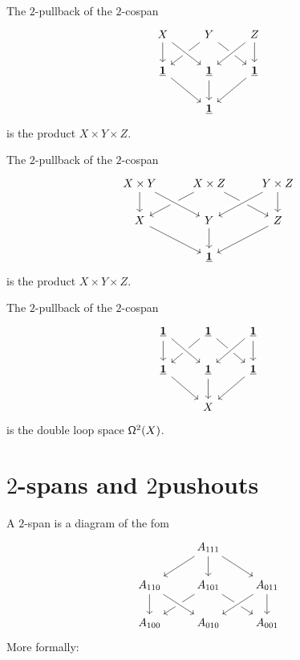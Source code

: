\begin{cor}
The $2$-pullback of the $2$-cospan
\begin{equation*}
\begin{tikzcd}
X \arrow[d] & Y \arrow[dl] \arrow[dr] & Z \arrow[d] \\
\unit \arrow[dr] & \unit \arrow[d] \arrow[from=ul,crossing over] \arrow[from=ur,crossing over] & \unit \arrow[dl] \\
& \unit
\end{tikzcd}
\end{equation*}
is the product $X\times Y\times Z$. 
\end{cor}

\begin{cor}
The $2$-pullback of the $2$-cospan
\begin{equation*}
\begin{tikzcd}
X\times Y \arrow[d] & X\times Z \arrow[dl] \arrow[dr] & Y\times Z \arrow[d] \\
X \arrow[dr] & Y \arrow[d] \arrow[from=ul,crossing over] \arrow[from=ur,crossing over] & Z \arrow[dl] \\
& \unit
\end{tikzcd}
\end{equation*}
is the product $X\times Y\times Z$. 
\end{cor}

\begin{cor}
The $2$-pullback of the $2$-cospan
\begin{equation*}
\begin{tikzcd}
\unit \arrow[d] & \unit \arrow[dl] \arrow[dr] & \unit \arrow[d] \\
\unit \arrow[dr] & \unit \arrow[d] \arrow[from=ul,crossing over] \arrow[from=ur,crossing over] & \unit \arrow[dl] \\
& X
\end{tikzcd}
\end{equation*}
is the double loop space $\loopspace[2]{X}$. 
\end{cor}

\section{\texorpdfstring{$2$}{2}-spans and \texorpdfstring{$2$}-pushouts}

A $2$-span is a diagram of the fom
\begin{equation*}
\begin{tikzcd}
& A_{111} \arrow[dl] \arrow[d] \arrow[dr] \\
A_{110} \arrow[d] & A_{101} \arrow[dl] \arrow[dr] & A_{011} \arrow[d] \\
A_{100} & A_{010} \arrow[from=ul,crossing over] \arrow[from=ur,crossing over] & A_{001}
\end{tikzcd}
\end{equation*}
More formally:

